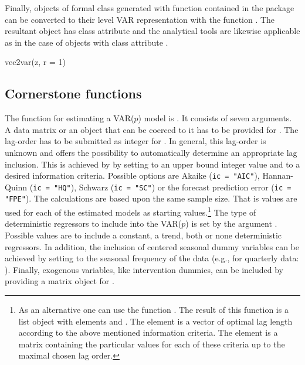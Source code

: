 \documentclass[nojss]{jss}
\begin{document}
Finally, objects of formal class  generated with function
 contained in the package  can be converted to
their level VAR representation with the function . The resultant
object has class attribute  and the analytical tools are
likewise applicable as in the case of objects with class attribute
.  
\begin{CodeInput}
vec2var(z, r = 1)    
\end{CodeInput}
\subsection{Cornerstone functions}
\label{subsec:cornerstone}
The function for estimating a VAR($p$) model is . It consists of
seven arguments. A data matrix or an object that can be coerced to it
has to be provided for . The lag-order has to be submitted as
integer for . In general, this lag-order is unknown and
 offers the possibility to automatically determine an
appropriate lag inclusion. This is achieved by by setting
 to an upper bound integer value and  to a desired
information criteria. Possible options are Akaike (\verb/ic = "AIC"/),
Hannan-Quinn (\verb/ic = "HQ"/), Schwarz (\verb/ic = "SC"/) or the
forecast prediction error (\verb/ic = "FPE"/). The calculations are
based upon the same sample size. That is  values are
used for each of the estimated models as starting values.\footnote{As
  an alternative one can use the function . The
  result of this function is a list object with elements
   and . The element 
  is a vector of optimal lag length according to the above mentioned
  information criteria. The element  is a matrix
  containing the particular values for each of these criteria up to
  the maximal chosen lag order.} The type of deterministic regressors
to include into the VAR($p$) is set by the argument
. Possible values are to include a constant, a trend, both
or none deterministic regressors. In addition, the inclusion of
centered seasonal dummy variables can be achieved by setting
 to the seasonal frequency of the data (e.g., for
quarterly data: ). Finally, exogenous variables, like
intervention dummies, can be included by providing a matrix object for
.
\end{document}
